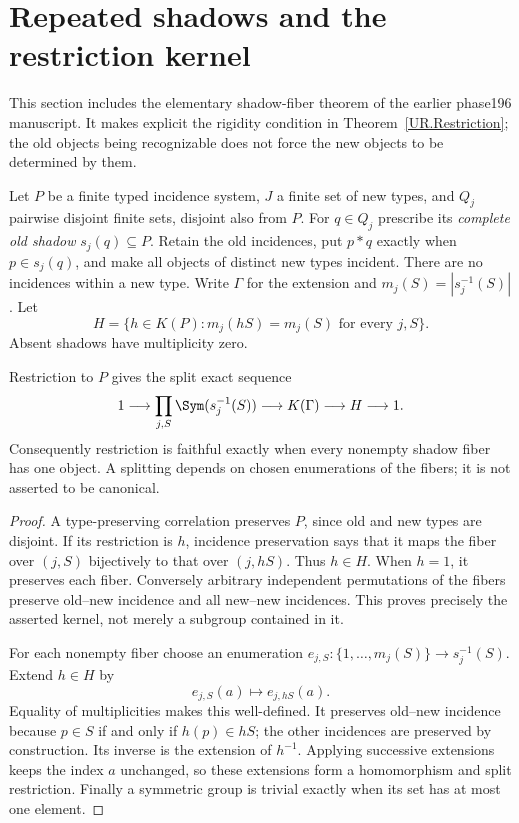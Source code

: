 \section{Repeated shadows and the restriction kernel}
\label{sec:shadows}
This section includes the elementary shadow-fiber theorem of the earlier
phase196 manuscript. It makes explicit the rigidity condition in
Theorem~\ref{UR.Restriction}; the old objects being recognizable does not
force the new objects to be determined by them.

Let $P$ be a finite typed incidence system, $J$ a finite set of new types,
and $Q_j$ pairwise disjoint finite sets, disjoint also from $P$. For
$q\in Q_j$ prescribe its \emph{complete old shadow} $s_j(q)\subseteq P$.
Retain the old incidences, put $p*q$ exactly when $p\in s_j(q)$, and make
all objects of distinct new types incident. There are no incidences within
a new type. Write $\Gamma$ for the extension and
$m_j(S)=|s_j^{-1}(S)|$. Let
\[
H=\{h\in K(P):m_j(hS)=m_j(S)\text{ for every }j,S\}.
\]
Absent shadows have multiplicity zero.

\begin{theorem}\label{UR.Shadows}
Restriction to $P$ gives the split exact sequence
\[
1\longrightarrow\prod_{j,S}\Sym(s_j^{-1}(S))
\longrightarrow K(\Gamma)\longrightarrow H\longrightarrow1.
\]
Consequently restriction is faithful exactly when every nonempty shadow
fiber has one object. A splitting depends on chosen enumerations of the
fibers; it is not asserted to be canonical.
\end{theorem}
\begin{proof}
A type-preserving correlation preserves $P$, since old and new types are
disjoint. If its restriction is $h$, incidence preservation says that it
maps the fiber over $(j,S)$ bijectively to that over $(j,hS)$. Thus $h\in H$.
When $h=1$, it preserves each fiber. Conversely arbitrary independent
permutations of the fibers preserve old--new incidence and all new--new
incidences. This proves precisely the asserted kernel, not merely a
subgroup contained in it.

For each nonempty fiber choose an enumeration
$e_{j,S}:\{1,\ldots,m_j(S)\}\to s_j^{-1}(S)$. Extend $h\in H$ by
\[
 e_{j,S}(a)\longmapsto e_{j,hS}(a).
\]
Equality of multiplicities makes this well-defined. It preserves
old--new incidence because $p\in S$ if and only if $h(p)\in hS$;
the other incidences are preserved by construction. Its inverse is the
extension of $h^{-1}$. Applying successive extensions keeps the index $a$
unchanged, so these extensions form a homomorphism and split restriction.
Finally a symmetric group is trivial exactly when its set has at most one
element.
\end{proof}

